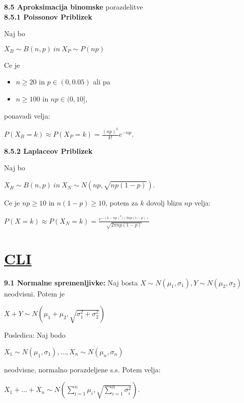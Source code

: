 \documentclass{article}
\begin{document}
\begin{multicols}{3}
\textbf{8.5 Aproksimacija binomske} porazdelitve\\

\textbf{8.5.1 Poissonov Priblizek}

Naj bo 
\begin{center}
    \begin{math}
        X_B \sim B(n, p)\: in\: X_P \sim P(np)
    \end{math}
\end{center}
Ce je 
\begin{itemize}
    \item $n \geq 20$ in $p \in (0, 0.05)$ ali pa
    \item $n \geq 100$ in $np \in (0, 10]$,
\end{itemize}
ponavadi velja:
\begin{center}
    \begin{math}
        P(X_B = k) \approx P(X_P = k) = \frac{(np)^k}{k!} e^{-np} 
    \end{math}.
\end{center}

\textbf{8.5.2 Laplaceov Priblizek}

Naj bo 
\begin{center}
    \begin{math}
        X_B \sim B(n, p)\: in\: X_N \sim N(np, \sqrt{np(1-p)})
    \end{math}.
\end{center}
Ce je $np \geq 10$ in $n(1 - p) \geq 10$, potem za $k$ dovolj blizu $np$ velja:
\begin{center}
    \begin{math}
        P(X = k) \approx P(X_N = k) = 
        \frac{
            e^{-(k - np)^2/ (2np(1 - p))}
        }{\sqrt{2 \pi np(1 - p)}}
    \end{math}
\end{center}

\section{\underline{CLI}}

\textbf{9.1 Normalne spremenljivke:} Naj bosta $X \sim N(\mu_1, \sigma_1), Y \sim N(\mu_2, \sigma_2)$ neodvisni.
Potem je 
\begin{center}
    \begin{math}
        X + Y \sim N(\mu_1 + \mu_2, \sqrt{\sigma_1^2 + \sigma_2^2})    
    \end{math}
\end{center}
Posledica: Naj bodo
\begin{center}
    \begin{math}
        X_1 \sim N(\mu_1, \sigma_1), \dots , X_n \sim  N(\mu_n, \sigma_n)
    \end{math}
\end{center}
neodvisne, normalno porazdeljene s.s. Potem velja:
\begin{center}
    \begin{math}
        X_1 + \dots + X_n \sim N (
            \sum_{i=1}^{n} \mu_i, \sqrt{\sum_{i=1}^{n} \sigma_i^2}
        )
    \end{math}.
\end{center}


\end{multicols}
\end{document}
